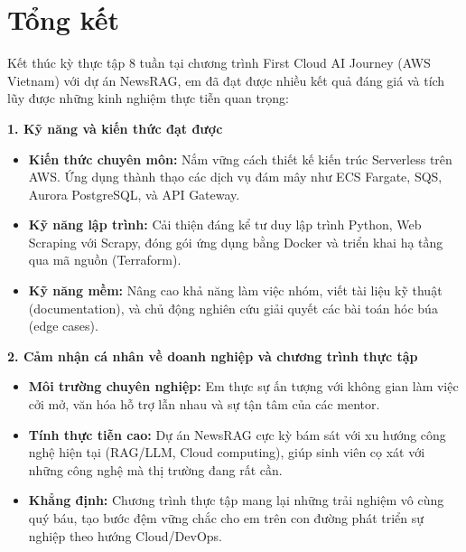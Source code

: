 \documentclass[a4paper]{article}
\theoremstyle{definition}
\begin{document}
\newpage
\tableofcontents
\newpage





\newpage
\section{Tổng kết}
Kết thúc kỳ thực tập 8 tuần tại chương trình First Cloud AI Journey (AWS Vietnam) với dự án NewsRAG, em đã đạt được nhiều kết quả đáng giá và tích lũy được những kinh nghiệm thực tiễn quan trọng:

\textbf{1. Kỹ năng và kiến thức đạt được}
\begin{itemize}
    \item \textbf{Kiến thức chuyên môn:} Nắm vững cách thiết kế kiến trúc Serverless trên AWS. Ứng dụng thành thạo các dịch vụ đám mây như ECS Fargate, SQS, Aurora PostgreSQL, và API Gateway.
    \item \textbf{Kỹ năng lập trình:} Cải thiện đáng kể tư duy lập trình Python, Web Scraping với Scrapy, đóng gói ứng dụng bằng Docker và triển khai hạ tầng qua mã nguồn (Terraform).
    \item \textbf{Kỹ năng mềm:} Nâng cao khả năng làm việc nhóm, viết tài liệu kỹ thuật (documentation), và chủ động nghiên cứu giải quyết các bài toán hóc búa (edge cases).
\end{itemize}

\textbf{2. Cảm nhận cá nhân về doanh nghiệp và chương trình thực tập}
\begin{itemize}
    \item \textbf{Môi trường chuyên nghiệp:} Em thực sự ấn tượng với không gian làm việc cởi mở, văn hóa hỗ trợ lẫn nhau và sự tận tâm của các mentor.
    \item \textbf{Tính thực tiễn cao:} Dự án NewsRAG cực kỳ bám sát với xu hướng công nghệ hiện tại (RAG/LLM, Cloud computing), giúp sinh viên cọ xát với những công nghệ mà thị trường đang rất cần.
    \item \textbf{Khẳng định:} Chương trình thực tập mang lại những trải nghiệm vô cùng quý báu, tạo bước đệm vững chắc cho em trên con đường phát triển sự nghiệp theo hướng Cloud/DevOps.
\end{itemize}

\end{document}
